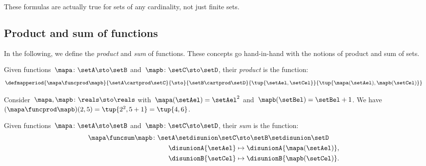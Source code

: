 These formulas are actually true for sets of any cardinality, not just finite sets.

\subsection{Product and sum of functions}
\label{sec:prod_dirsum_functions}

In the following, we define the \emph{product} and \emph{sum} of functions.
These concepts go hand-in-hand with the notions of product and sum of sets.

\begin{ctdefinition}
    \label{def:product-of-functions}
    Given functions~$\mapa\colon \setA \sto \setB$ and~$\mapb\colon \setC \sto \setD$, their \emph{product} is the function:
    \begin{equation}
        \defmapperiod{
            \mapa \funcprod \mapb
        }{
            \setA \cartprod \setC
        }{
            \sto
        }{
            \setB\cartprod \setD
        }{
            \tup{\setAel, \setCel}
        }{
            \tup{\mapa(\setAel),\mapb(\setCel)}
        }
    \end{equation}
\end{ctdefinition}

\begin{example}
    Consider~$\mapa,\mapb \colon \reals \sto \reals$ with~$\mapa(\setAel)=\setAel^2$ and~$\mapb(\setBel)=\setBel+1$.
    We have~$(\mapa \funcprod \mapb)(2,5)=\tup{2^2,5+1}=\tup{4,6}$.
\end{example}

\begin{ctdefinition}
    \label{def:sum-of-functions}
    Given functions~$\mapa\colon \setA \sto \setB$ and~$\mapb\colon \setC \sto \setD$, their \emph{sum} is the function:
    \begin{equation}
        \begin{aligned}
            \mapa \funcsum \mapb \colon \setA \setdisunion \setC & \sto \setB\setdisunion \setD \\
            \disunionA{\setAel}                                  & \mapsto \disunionA{\mapa(\setAel)}, \\
            \disunionB{\setCel}                                  & \mapsto \disunionB{\mapb(\setCel)}.
            \\
        \end{aligned}
    \end{equation}
\end{ctdefinition}

